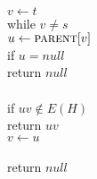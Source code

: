 \documentclass[11pt]{article}
\begin{document}
\begin{itemize}
\begin{algo}
	\+
\\[0.5ex]
\\
\\		$v \gets t$
\\		while $v \neq s$\+
\\			$u \gets \textsc{parent}[v]$
\\			if $u = null$\+
\\				return $null$\-
\\
\\			if $uv \notin E(H)$\+
\\				return $uv$\-
\\			$v \gets u$\-
\\		
\\		return $null$
\\		
\\[0.5ex]
\end{algo}




	
\end{itemize}
\end{document}
